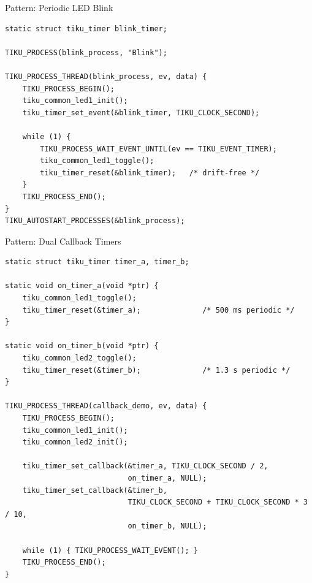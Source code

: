 \documentclass[aspectratio=169, 10pt]{beamer}
\begin{document}
\begin{frame}[fragile]{Pattern: Periodic LED Blink}
\begin{lstlisting}[style=cstyle, title={examples/01\_blink/blink.c}]
static struct tiku_timer blink_timer;

TIKU_PROCESS(blink_process, "Blink");

TIKU_PROCESS_THREAD(blink_process, ev, data) {
    TIKU_PROCESS_BEGIN();
    tiku_common_led1_init();
    tiku_timer_set_event(&blink_timer, TIKU_CLOCK_SECOND);

    while (1) {
        TIKU_PROCESS_WAIT_EVENT_UNTIL(ev == TIKU_EVENT_TIMER);
        tiku_common_led1_toggle();
        tiku_timer_reset(&blink_timer);   /* drift-free */
    }
    TIKU_PROCESS_END();
}
TIKU_AUTOSTART_PROCESSES(&blink_process);
\end{lstlisting}
\end{frame}

\begin{frame}[fragile]{Pattern: Dual Callback Timers}
\begin{lstlisting}[style=cstyle, title={examples/06\_callback\_timer/callback\_timer.c (simplified)}]
static struct tiku_timer timer_a, timer_b;

static void on_timer_a(void *ptr) {
    tiku_common_led1_toggle();
    tiku_timer_reset(&timer_a);              /* 500 ms periodic */
}

static void on_timer_b(void *ptr) {
    tiku_common_led2_toggle();
    tiku_timer_reset(&timer_b);              /* 1.3 s periodic */
}

TIKU_PROCESS_THREAD(callback_demo, ev, data) {
    TIKU_PROCESS_BEGIN();
    tiku_common_led1_init();
    tiku_common_led2_init();

    tiku_timer_set_callback(&timer_a, TIKU_CLOCK_SECOND / 2,
                            on_timer_a, NULL);
    tiku_timer_set_callback(&timer_b,
                            TIKU_CLOCK_SECOND + TIKU_CLOCK_SECOND * 3 / 10,
                            on_timer_b, NULL);

    while (1) { TIKU_PROCESS_WAIT_EVENT(); }
    TIKU_PROCESS_END();
}
\end{lstlisting}
\end{frame}
\end{document}
